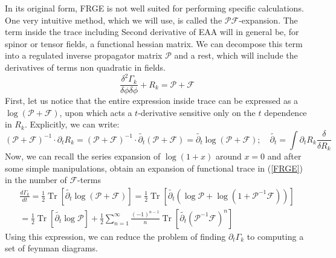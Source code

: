 \documentclass[11pt, a4paper]{article}
\begin{document}
In its original form, FRGE is not well suited for performing specific calculations. One very intuitive method, which
we will use, is called the $\mathcal{PF}$-expansion. 
The term inside the trace including Second derivative of EAA
will in general be, for spinor or tensor fields, a functional hessian matrix. We can decompose this term into a
regulated inverse propagator matrix $\mathcal{P}$ and a rest, which will include the derivatives of terms non quadratic in fields.
\begin{equation}
    \frac{\delta^2 \Gamma_k}{\delta \phi \delta \phi} + R_k = \mathcal{P} + \mathcal{F}
    \label{pf1}
\end{equation}
First, let us notice that the entire expression inside trace can be expressed as a $\log{(\mathcal{P}+\mathcal{F})}$, upon which acts
a $t$-derivative sensitive only on the $t$ dependence in $R_k$. Explicitly, we can write:
\begin{equation}
    \left(\mathcal{P} + \mathcal{F}\right)^{-1} \cdot \partial_t R_k = \left(\mathcal{P} + \mathcal{F}\right)^{-1} \cdot \widetilde{\partial_t} \left(\mathcal{P}+\mathcal{F}\right) = \widetilde{\partial_t} \log{\left(\mathcal{P}+\mathcal{F}\right)}; \quad \widetilde{\partial_t} = \int \partial_t R_k \frac{\delta}{\delta R_k}
\end{equation}
Now, we can recall the series expansion of $\log{(1+x)}$ around $x=0$ and after some simple manipulations, obtain an expansion of functional trace in (\ref{FRGE}) in
the number of $\mathcal{F}$-terms
\begin{gather}
    \frac{d \Gamma_k}{dt} = \frac{1}{2} \operatorname{Tr} \left[ \widetilde{\partial_t} \log{\left(\mathcal{P}+\mathcal{F}\right)} \right] = \frac{1}{2} \operatorname{Tr} \left[ \widetilde{\partial_t} \left(\log{\mathcal{P}} + \log{(1+\mathcal{P}^{-1}\mathcal{F})}\right) \right] \\ =  \frac{1}{2} \operatorname{Tr} \left[ \widetilde{\partial_t} \log{\mathcal{P}} \right] + \frac{1}{2} \sum_{n=1}^{\infty} \frac{(-1)^{n-1}}{n} \operatorname{Tr}\left[\widetilde{\partial_t}\left(\mathcal{P}^{-1}\mathcal{F}\right)^n\right]
    \label{pf}
\end{gather}
Using this expression, we can reduce the problem of finding $\partial_t \Gamma_k$ to computing a set of feynman diagrams.
\end{document}
